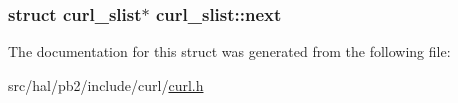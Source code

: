 \subsubsection[{\texorpdfstring{next}{next}}]{\setlength{\rightskip}{0pt plus 5cm}struct {\bf curl\+\_\+slist}$\ast$ curl\+\_\+slist\+::next}\hypertarget{structcurl__slist_a56fcfc41d89a47865933c310d316a108}{}\label{structcurl__slist_a56fcfc41d89a47865933c310d316a108}


The documentation for this struct was generated from the following file\+:\begin{DoxyCompactItemize}
\item 
src/hal/pb2/include/curl/\hyperlink{curl_8h}{curl.\+h}\end{DoxyCompactItemize}
